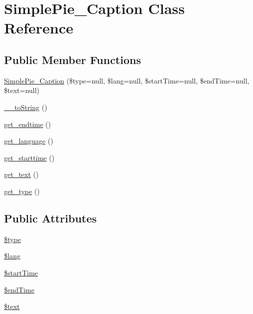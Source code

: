 \hypertarget{class_simple_pie___caption}{\section{Simple\-Pie\-\_\-\-Caption Class Reference}
\label{class_simple_pie___caption}
}
\subsection*{Public Member Functions}
\begin{DoxyCompactItemize}
\item 
\hyperlink{class_simple_pie___caption_a0c39bdb1e5fdb922b3142baeb9571309}{Simple\-Pie\-\_\-\-Caption} (\$type=null, \$lang=null, \$start\-Time=null, \$end\-Time=null, \$text=null)
\item 
\hyperlink{class_simple_pie___caption_a43f5c2d8469c01cd354cdc570998696b}{\-\_\-\-\_\-to\-String} ()
\item 
\hyperlink{class_simple_pie___caption_abc676f69070caf2247f6c7f941700332}{get\-\_\-endtime} ()
\item 
\hyperlink{class_simple_pie___caption_a1f3892c3098a2946e9cb103bec45a807}{get\-\_\-language} ()
\item 
\hyperlink{class_simple_pie___caption_a2b9fa771bd6e188fe865e53d96ac567b}{get\-\_\-starttime} ()
\item 
\hyperlink{class_simple_pie___caption_a28478b375f537017eff0770f20505ca5}{get\-\_\-text} ()
\item 
\hyperlink{class_simple_pie___caption_aa24b4220bca544248975966f3e94c785}{get\-\_\-type} ()
\end{DoxyCompactItemize}
\subsection*{Public Attributes}
\begin{DoxyCompactItemize}
\item 
\hyperlink{class_simple_pie___caption_aa53512dffe2b16d1870968db81b3c350}{\$type}
\item 
\hyperlink{class_simple_pie___caption_aa5be61a0b9573aab30c5b3d65028a3f4}{\$lang}
\item 
\hyperlink{class_simple_pie___caption_ab7c0b93c95df50e39e5ebb9e774dc5fa}{\$start\-Time}
\item 
\hyperlink{class_simple_pie___caption_a9d16511397036c304ccda64245c599f8}{\$end\-Time}
\item 
\hyperlink{class_simple_pie___caption_a4e59cf6625f8dba2e4ce7aed97018861}{\$text}
\end{DoxyCompactItemize}



